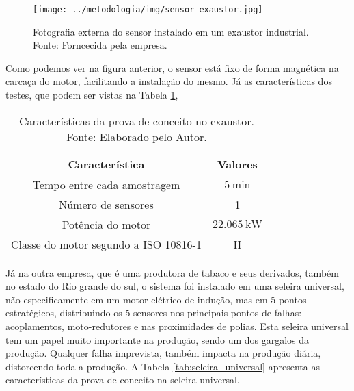 \documentclass[a4paper]{ifacconf}
\begin{document}
\begin{figure}[h!]
  \begin{center}
      \texttt{[image: ../metodologia/img/sensor\_exaustor.jpg]}
  \end{center}
  \caption{Fotografia externa do sensor instalado em um exaustor industrial. Fonte: Forncecida pela empresa.}
  \label{fig:sensor_exaustor}
\end{figure}

Como podemos ver na figura anterior, o sensor está fixo de forma magnética na carcaça do motor, facilitando a instalação do mesmo. Já as 
características dos testes, que podem ser vistas na Tabela \ref{tab:exautor}, 

\begin{table}[H]
    \caption{Características da prova de conceito no exaustor. Fonte: Elaborado pelo Autor.}
    \label{tab:exautor}
    \centering%
    \begin{minipage}{.33\textwidth}
      \begin{tabular*}{\textwidth}{c|c}
        \hline
        Característica                          & Valores                                    \\ \hline
        \hline
        Tempo entre cada amostragem             &  $\SI{5}{\minute}$                         \\
        Número de sensores                      &  1                                         \\ 
        Potência do motor                       &  $\SI{22.065}{\kilo\watt}$                      \\
        Classe do motor segundo a  ISO 10816-1  &  II                                         \\
      \end{tabular*} 
    \end{minipage}
  \end{table}


Já na outra empresa, que é uma produtora de tabaco e seus derivados, também no estado do Rio grande do sul, o sistema foi instalado em uma 
seleira universal, não especificamente em um motor elétrico de indução, mas em 5 pontos estratégicos, distribuindo os 5 sensores nos principais pontos 
de falhas: acoplamentos, moto-redutores e nas proximidades de polias. Esta seleira universal tem um papel muito importante na produção, sendo um dos gargalos
da produção. Qualquer falha imprevista, também impacta na produção diária, distorcendo toda a produção. A Tabela \ref{tab:seleira_universal} apresenta 
as características da prova de conceito na seleira universal.
\end{document}
